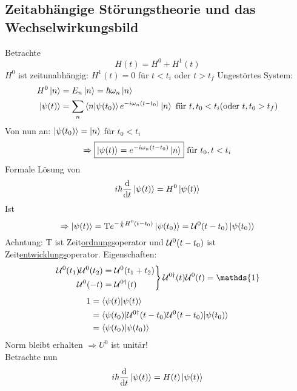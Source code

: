 	\subsection{Zeitabhängige Störungstheorie und das Wechselwirkungsbild}
	Betrachte 
		\begin{equation*}
			H(t) = H^0 + H^1 (t)
		\end{equation*}
	$H^0$ ist zeitunabhängig: $H^1(t) = 0$ für $t < t_i$ oder $t > t_f$
	Ungestörtes System: 
		\begin{align*}
			H^0 \ket{n} &= E_n \ket{n} = \hbar \omega_n \ket{n} \\
			\ket{\psi(t)} &= \sum_n \braket{n | \psi(t_0)} e^{-i \omega_n (t-t_0)} \ket{n} \text{~für~} t, t_0 < t_i (\text{oder~} t, t_0 > t_f)
		\end{align*}
	Von nun an: $\ket{\psi(t_0)} = \ket{n}$ für $t_0 < t_i$
		\begin{equation*}
			\Rightarrow \boxed{\ket{\psi (t)} = e^{-i \omega_n (t-t_0)} \ket{n}
			} \text{~für~} t_0, t < t_i
		\end{equation*}		
	Formale Lösung von 
		\begin{equation*}
			i \hbar \frac{\mathrm{d}}{\mathrm{d} t} \ket{\psi(t)}
			= H^0 \ket{\psi(t)}
		\end{equation*}			
	Ist
		\begin{equation*}
			\Rightarrow \ket{\psi(t)} = \text{T} e^{-\frac{i}{\hbar} H^0 (t-t_0)} 
			\ket{\psi(t_0)} = \mathcal{U}^0(t-t_0) \ket{\psi(t_0)}
		\end{equation*}
	Achntung: T ist Zeit\underline{ordnungs}operator und $\mathcal{U}^0(t-t_0)$ ist Zeit\underline{entwicklungs}operator.
	Eigenschaften:
		\begin{align*}
			\left.
			\begin{aligned}
				\U^0(t_1) \U^0(t_2) &= \U^0(t_1 + t_2) \\
				\U^0(-t) &= \U^{0\dagger} (t)		
			\end{aligned}
			\right\} \U^{0\dagger} (t) \U^0 (t) = \mathds{1}
		\end{align*}
		\begin{align*}
			1 &= \braket{\psi(t) | \psi(t)} \\
			&= \braket{\psi(t_0) | \mathcal{U}^{0 \dagger} (t-t_0) \mathcal{U}^0 (t-t_0) | \psi(t_0)} \\
			&= \braket{\psi(t_0) | \psi(t_0)}
		\end{align*}
	Norm bleibt erhalten $\Rightarrow U^0$ ist unitär! \\
	Betrachte nun 
		\begin{equation*}
			i \hbar \frac{\mathrm{d}}{\mathrm{d} t} \ket{\psi(t)} = H(t) \ket{\psi(t)}
		\end{equation*}
